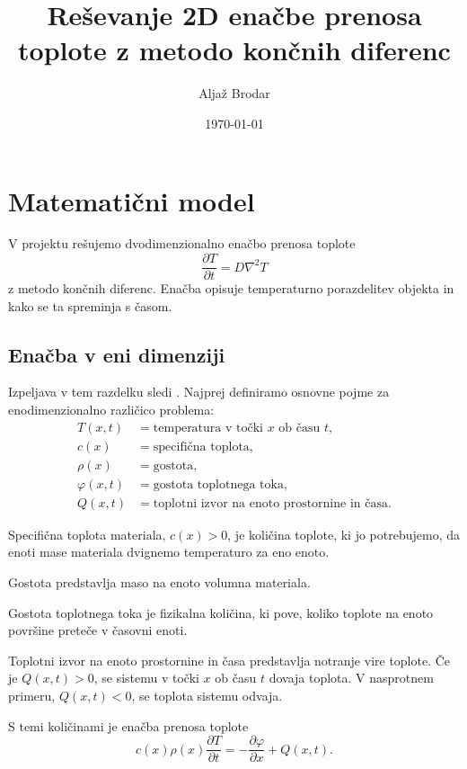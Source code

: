 \documentclass[a4paper,11pt]{article}
\title{Reševanje 2D enačbe prenosa toplote z metodo končnih diferenc}
\author{Aljaž Brodar}
\date{\today}
\begin{document}
	
	\maketitle
	\newpage
	\tableofcontents
	\newpage
	
	\section{Matematični model}
	
	V projektu rešujemo dvodimenzionalno enačbo prenosa toplote
	\begin{equation}
		\frac{\partial T}{\partial t} = D \nabla^2 T
		\label{eq:toplota}
	\end{equation}
	z metodo končnih diferenc. Enačba opisuje temperaturno porazdelitev objekta in kako se ta spreminja s časom.
	
	\subsection{Enačba v eni dimenziji}
	
	Izpeljava v tem razdelku sledi \cite{dawkins}. Najprej definiramo osnovne pojme za enodimenzionalno različico problema:
	\begin{align*}
		T(x, t)       &= \text{temperatura v točki } x \text{ ob času } t, \\
		c(x)          &= \text{specifična toplota}, \\
		\rho(x)       &= \text{gostota}, \\
		\varphi(x, t) &= \text{gostota toplotnega toka}, \\
		Q(x, t)       &= \text{toplotni izvor na enoto prostornine in časa}.
	\end{align*}
	
	Specifična toplota materiala, $c(x) > 0$, je količina toplote, ki jo potrebujemo, da enoti mase materiala dvignemo temperaturo za eno enoto.
	
	Gostota predstavlja maso na enoto volumna materiala.
	
	Gostota toplotnega toka je fizikalna količina, ki pove, koliko toplote na enoto površine preteče v časovni enoti.
	
	Toplotni izvor na enoto prostornine in časa predstavlja notranje vire toplote. Če je $Q(x, t) > 0$, se sistemu v točki $x$ ob času $t$ dovaja toplota. V nasprotnem primeru, $Q(x, t) < 0$, se toplota sistemu odvaja.
	
	S temi količinami je enačba prenosa toplote
	\begin{equation}
		c(x)\rho(x) \frac{\partial T}{\partial t} = -\frac{\partial \varphi}{\partial x} + Q(x, t).
		\label{eq:bilanca1d}
	\end{equation}
	
\end{document}
